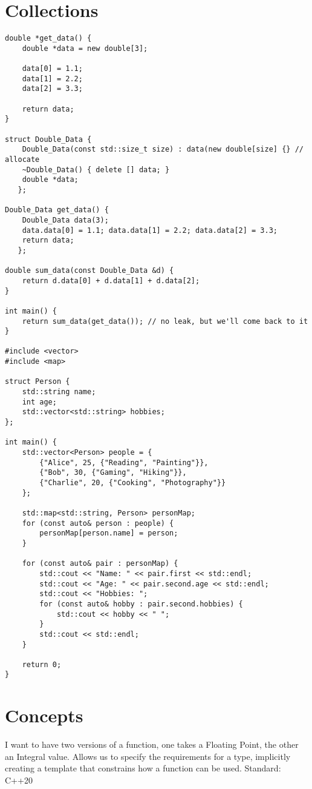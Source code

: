 \section{Collections}

\begin{verbatim}
double *get_data() {
    double *data = new double[3];

    data[0] = 1.1;
    data[1] = 2.2;
    data[2] = 3.3;

    return data;
}

struct Double_Data {
    Double_Data(const std::size_t size) : data(new double[size] {} // allocate
    ~Double_Data() { delete [] data; }
    double *data;
   };

Double_Data get_data() {
    Double_Data data(3);
    data.data[0] = 1.1; data.data[1] = 2.2; data.data[2] = 3.3;
    return data;
   };

double sum_data(const Double_Data &d) {
    return d.data[0] + d.data[1] + d.data[2];
}

int main() {
    return sum_data(get_data()); // no leak, but we'll come back to it
}

#include <vector>
#include <map>

struct Person {
    std::string name;
    int age;
    std::vector<std::string> hobbies;
};

int main() {
    std::vector<Person> people = {
        {"Alice", 25, {"Reading", "Painting"}},
        {"Bob", 30, {"Gaming", "Hiking"}},
        {"Charlie", 20, {"Cooking", "Photography"}}
    };

    std::map<std::string, Person> personMap;
    for (const auto& person : people) {
        personMap[person.name] = person;
    }

    for (const auto& pair : personMap) {
        std::cout << "Name: " << pair.first << std::endl;
        std::cout << "Age: " << pair.second.age << std::endl;
        std::cout << "Hobbies: ";
        for (const auto& hobby : pair.second.hobbies) {
            std::cout << hobby << " ";
        }
        std::cout << std::endl;
    }

    return 0;
}
\end{verbatim}


\section{Concepts}

I want to have two versions of a function, one takes a Floating Point, the other an Integral value.
Allows us to specify the requirements for a type, implicitly creating a template
that constrains how a function can be used. Standard: C++20

